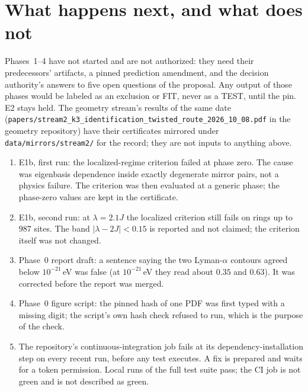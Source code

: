 \documentclass[11pt,a4paper]{article}
\begin{document}
\section{What happens next, and what does not}\label{sec:next}

Phases~1--4 have not started and are not authorized: they need their predecessors' artifacts, a pinned
prediction amendment, and the decision authority's answers to five open questions of the proposal. Any output
of those phases would be labeled as an exclusion or FIT, never as a TEST, until the pin. E2 stays held. The
geometry stream's results of the same date (\texttt{papers/stream2\_k3\_identification\_twisted\_route\_2026\_10\_08.pdf}
in the geometry repository) have their certificates mirrored under \nolinkurl{data/mirrors/stream2/} for the
record; they are not inputs to anything above.

\begin{correctionbox}
\begin{enumerate}
\item E1b, first run: the localized-regime criterion failed at phase zero. The cause was eigenbasis
  dependence inside exactly degenerate mirror pairs, not a physics failure. The criterion was then evaluated at
  a generic phase; the phase-zero values are kept in the certificate.
\item E1b, second run: at $\lambda=2.1J$ the localized criterion still fails on rings up to $987$ sites. The band
  $|\lambda-2J|<0.15$ is reported and not claimed; the criterion itself was not changed.
\item Phase~0 report draft: a sentence saying the two Lyman-$\alpha$ contours agreed below $10^{-21}$\,eV was
  false (at $10^{-21}$\,eV they read about $0.35$ and $0.63$). It was corrected before the report was merged.
\item Phase~0 figure script: the pinned hash of one PDF was first typed with a missing digit; the script's own
  hash check refused to run, which is the purpose of the check.
\item The repository's continuous-integration job fails at its dependency-installation step on every recent
  run, before any test executes. A fix is prepared and waits for a token permission. Local runs of the full
  test suite pass; the CI job is not green and is not described as green.
\end{enumerate}
\end{correctionbox}
\end{document}
